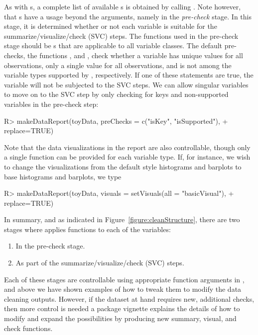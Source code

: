 \documentclass[article,shortnames]{jss}
\begin{document}
As with s, a complete list of available
s is obtained by calling
. Note however, that s have a
usage beyond the  arguments, namely in the
\textit{pre-check} stage. In this stage, it is determined whether or
not each variable is suitable for the summarize/visualize/check (SVC)
steps. The functions used in the pre-check stage should be
s that are applicable to all variable classes. The
default pre-checks, the functions ,  and , check
whether a variable has unique values for all observations, only a
single value for all observations, and is not among the variable types supported by , respectively. If one of these
statements are true, the variable will not be subjected to the SVC
steps.  We can allow singular variables to move on to the SVC step by
only checking for keys and non-supported variables in the pre-check step:

\begin{Schunk}
\begin{Sinput}
R> makeDataReport(toyData, preChecks = c("isKey", "isSupported"), 
+    replace=TRUE)
\end{Sinput}
\end{Schunk}

Note that the data visualizations in the report are also
controllable, though only a single function can be provided for each variable type. If, for instance, we wish to change the visualizations
from the default  \citep{ggplot2} style histograms and barplots to base
 histograms and barplots, we type

\begin{Schunk}
\begin{Sinput}
R> makeDataReport(toyData, visuals = setVisuals(all = "basicVisual"), 
+    replace=TRUE)
\end{Sinput}
\end{Schunk}

In summary, and as indicated in Figure~\ref{figure:cleanStructure}, there are two stages
where  applies functions to each of the variables:
\begin{enumerate}
\item In the pre-check stage.
\item As part of the summarize/visualize/check (SVC) steps.
\end{enumerate}
Each of these stages are controllable using appropriate function
arguments in , and above we have shown examples
of how to tweak them to modify the data cleaning outputs. However, if
the dataset at hand requires new, additional checks, then more control
is needed a package vignette explains the details of how to modify and
expand the possibilities by producing new summary, visual, and check
functions.
\end{document}
